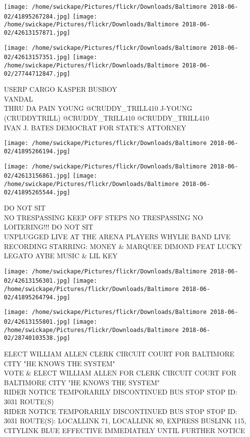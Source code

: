 \documentclass[10pt,letterpaper]{article}
\begin{document}
\texttt{[image: /home/swickape/Pictures/flickr/Downloads/Baltimore 2018-06-02/41895267284.jpg]}
\texttt{[image: /home/swickape/Pictures/flickr/Downloads/Baltimore 2018-06-02/42613157871.jpg]}

\texttt{[image: /home/swickape/Pictures/flickr/Downloads/Baltimore 2018-06-02/42613157351.jpg]}
\texttt{[image: /home/swickape/Pictures/flickr/Downloads/Baltimore 2018-06-02/27744712847.jpg]}

USERP CARGO KASPER BUSBOY\\
VANDAL\\
THRU DA PAIN YOUNG @CRUDDY\_TRILL410 J{-}YOUNG (CRUDDYTRILL) @CRUDDY\_TRILL410 @CRUDDY\_TRILL410\\
IVAN J. BATES DEMOCRAT FOR STATE'S ATTORNEY\\
\pagebreak

\texttt{[image: /home/swickape/Pictures/flickr/Downloads/Baltimore 2018-06-02/41895266194.jpg]}

\vspace{0.25in}
\texttt{[image: /home/swickape/Pictures/flickr/Downloads/Baltimore 2018-06-02/42613156861.jpg]}
\texttt{[image: /home/swickape/Pictures/flickr/Downloads/Baltimore 2018-06-02/41895265544.jpg]}

DO NOT SIT\\
NO TRESPASSING KEEP OFF STEPS NO TRESPASSING NO LOITERING!!! DO NOT SIT\\
UNPLUGGED LIVE AT THE ARENA PLAYERS WHYLIE BAND LIVE RECORDING STARRING: MONEY \& MARQUEE DIMOND FEAT LUCKY LEGATO AYBE MUSIC \& LIL KEY\\
\pagebreak

\texttt{[image: /home/swickape/Pictures/flickr/Downloads/Baltimore 2018-06-02/42613156301.jpg]}
\texttt{[image: /home/swickape/Pictures/flickr/Downloads/Baltimore 2018-06-02/41895264794.jpg]}

\texttt{[image: /home/swickape/Pictures/flickr/Downloads/Baltimore 2018-06-02/42613155801.jpg]}
\texttt{[image: /home/swickape/Pictures/flickr/Downloads/Baltimore 2018-06-02/28740103538.jpg]}

ELECT WILLIAM ALLEN CLERK CIRCUIT COURT FOR BALTIMORE CITY "HE KNOWS THE SYSTEM"\\
VOTE \& ELECT WILLIAM ALLEN FOR CLERK CIRCUIT COURT FOR BALTIMORE CITY "HE KNOWS THE SYSTEM"\\
RIDER NOTICE TEMPORARILY DISCONTINUED BUS STOP STOP ID: 3031 ROUTE(S)\\
RIDER NOTICE TEMPORARILY DISCONTINUED BUS STOP STOP ID: 3031 ROUTE(S): LOCALLINK 71, LOCALLINK 80, EXPRESS BUSLINK 115, CITYLINK BLUE EFFECTIVE IMMEDIATELY UNTIL FURTHER NOTICE\\
\pagebreak
\end{document}
